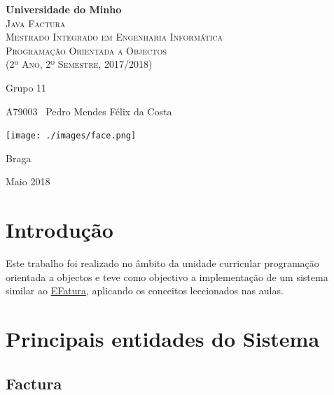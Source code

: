 \documentclass[12pt,a4paper]{report}
\begin{document}
\begin{titlepage}
    \center
    {\huge {\bf Universidade do Minho}}\\[0.4cm]
    \vspace{3.0cm}
    \textsc{\huge{Java Factura}}\\[0.5cm]
    \vspace{3.0cm}
    \textsc{\huge{Mestrado Integrado em Engenharia Informática}}\\[0.5cm]
    \vspace{2.0cm}
    \textsc{Programação Orientada a Objectos}\\[0.5cm]
    \textsc{(2º Ano, 2º Semestre, 2017/2018)}\\[0.5cm]
    \vspace{1.5cm}
    \begin{flushleft}
        Grupo 11
        \vspace{1cm}

        A79003 \,\,\,Pedro Mendes Félix da Costa
        \vspace{1cm}

        \texttt{[image: ./images/face.png]}
    \end{flushleft}
        \vspace{1cm}
    \begin{flushright}
        Braga

        Maio 2018
    \end{flushright}

\end{titlepage}

\tableofcontents
\listoffigures

\chapter{Introdução}
    Este trabalho foi realizado no âmbito da unidade curricular programação
    orientada a objectos e teve como objectivo a implementação de um sistema
    similar ao \href{https://faturas.portaldasfinancas.gov.pt}{EFatura},
    aplicando os conceitos leccionados nas aulas.

\chapter{Principais entidades do Sistema}
    \section{Factura}
\end{document}
